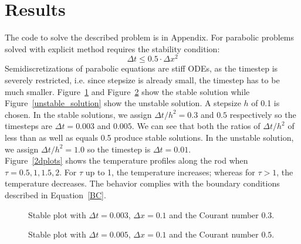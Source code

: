 \documentclass{article}
\begin{document}
\section{Results}

The code to solve the described problem is in Appendix. For parabolic problems solved with explicit method requires the stability condition:
\begin{equation}
    \Delta t \leq 0.5 \cdot \Delta x^2
\end{equation}
Semidiscretizations of parabolic equations are stiff ODEs, as the timestep is severely restricted, i.e. since stepsize is already small, the timestep has to be much smaller. Figure~\ref{stable_solution_0} and Figure~\ref{stable_solution} show the stable solution while Figure~\ref{unstable_solution} show the unstable solution. A stepsize $h$ of 0.1 is chosen. In the stable solutions, we assign $\Delta t / h^2 = 0.3$ and $0.5$ respectively so the timesteps are $\Delta t =  0.003$ and $0.005$. We can see that both the ratios of $\Delta t / h^2$ of less than as well as equals 0.5 produce stable solutions. In the unstable solution, we assign $\Delta t / h^2 = 1.0$ so the timestep is $\Delta t =  0.01$.  \\ 

\noindent
Figure~\ref{2dplots} shows the temperature profiles along the rod when $\tau = 0.5, 1, 1.5, 2$. For $\tau$ up to 1, the temperature increases; whereas for $\tau > 1$, the temperature decreases. The behavior complies with the boundary conditions described in Equation~\ref{BC}.

\begin{figure}
  \centering
  \caption{Stable plot with $\Delta t = 0.003$, $\Delta x = 0.1$ and the
    Courant number $0.3$.}
    \label{stable_solution_0}
\end{figure}

\begin{figure}
  \centering
  \caption{Stable plot with $\Delta t = 0.005$, $\Delta x = 0.1$ and the
    Courant number $0.5$.}
    \label{stable_solution}
\end{figure}
\end{document}
